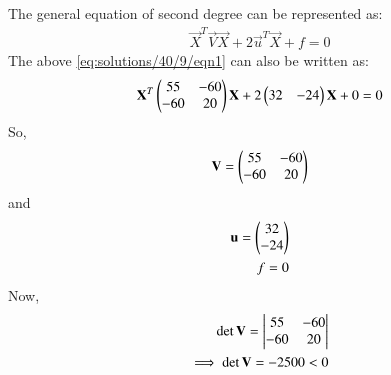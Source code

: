 The general equation of second degree can be represented as:
\begin{align}
\vec{X}^T\vec{V}\vec{X} + 2\vec{u}^T\vec{X} + f = 0
\end{align}
The above \ref{eq:solutions/40/9/eqn1} can also be written as:
\begin{align}
\mathbf{X}^T\begin{pmatrix}55 & -60\\-60 & 20\end{pmatrix}\mathbf{X} + 2\begin{pmatrix}32 & -24\end{pmatrix}\mathbf{X} +0 = 0
\end{align}
So, 
\begin{align}
\mathbf{V} = \begin{pmatrix}55 & -60\\-60 & 20\end{pmatrix}
\end{align}
and 
\begin{align}
\mathbf{u} = \begin{pmatrix}32 \\ -24\end{pmatrix}\\
f=0
\end{align}
Now, 
\begin{align}
\det{\mathbf{V}} = \begin{vmatrix}55 & -60\\-60 & 20\end{vmatrix}\\
\implies \det{\mathbf{V}} = -2500 <0
\end{align}

